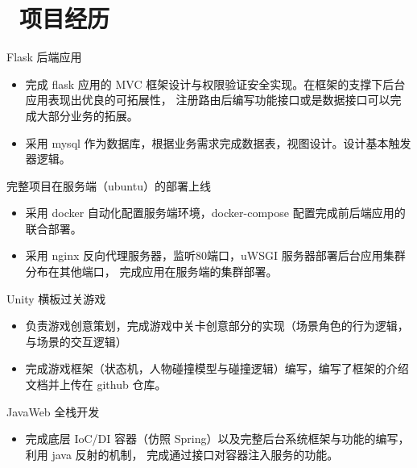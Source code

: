 \documentclass{resume}
\begin{document}
  \section{\faUsers\ 项目经历}

  \begin{onehalfspacing}
  Flask 后端应用
    \begin{itemize}
      \item 完成 flask 应用的 MVC 框架设计与权限验证安全实现。在框架的支撑下后台应用表现出优良的可拓展性，
      注册路由后编写功能接口或是数据接口可以完成大部分业务的拓展。
      \item 采用 mysql 作为数据库，根据业务需求完成数据表，视图设计。设计基本触发器逻辑。
    \end{itemize}
  完整项目在服务端（ubuntu）的部署上线
    \begin{itemize}
      \item 采用 docker 自动化配置服务端环境，docker-compose 配置完成前后端应用的联合部署。
      \item 采用 nginx 反向代理服务器，监听80端口，uWSGI 服务器部署后台应用集群分布在其他端口，
      完成应用在服务端的集群部署。
    \end{itemize}
  
  \end{onehalfspacing}

  \begin{onehalfspacing}
  Unity 横板过关游戏
    \begin{itemize}
      \item 负责游戏创意策划，完成游戏中关卡创意部分的实现（场景角色的行为逻辑，与场景的交互逻辑）
      \item 完成游戏框架（状态机，人物碰撞模型与碰撞逻辑）编写，编写了框架的介绍文档并上传在 github 仓库。
    \end{itemize}
  \end{onehalfspacing}

  \begin{onehalfspacing}
  JavaWeb 全栈开发
  \begin{itemize}
    \item 完成底层 IoC/DI 容器（仿照 Spring）以及完整后台系统框架与功能的编写，利用 java 反射的机制，
    完成通过接口对容器注入服务的功能。    
  \end{itemize}
  \end{onehalfspacing}
\end{document}

